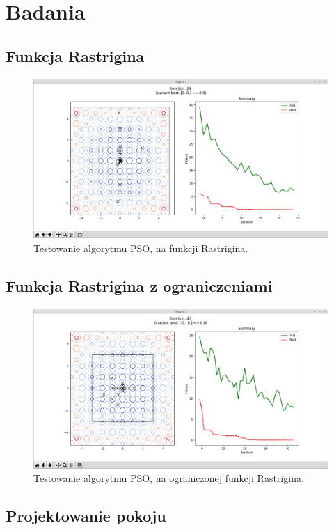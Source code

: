 \pagebreak
\section{Badania}

\subsection{Funkcja Rastrigina}

\begin{figure}[H]
	\centering
	\includegraphics[width=0.7\linewidth]{imgs/program_rastrigin}
	\caption{Testowanie algorytmu PSO, na funkcji Rastrigina.}
	\label{fig:program_rastrigin}
\end{figure}


\subsection{Funkcja Rastrigina z ograniczeniami}

\begin{figure}[H]
	\centering
	\includegraphics[width=0.7\linewidth]{imgs/program_limited_rastrigin}
	\caption{Testowanie algorytmu PSO, na ograniczonej funkcji Rastrigina.}
	\label{fig:program_limited_rastrigin}
\end{figure}


\subsection{Projektowanie pokoju}

